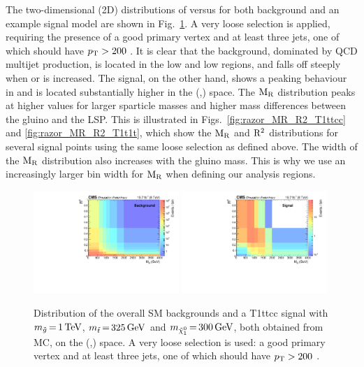 The two-dimensional (2D) distributions of \rsq versus \mr for both background and an example signal
model are shown in Fig.~\ref{fig:razor_MR_Rsq_bg_signal}. A very loose selection is applied,
requiring the presence of a good primary vertex and at least three jets, one of which should have
$p_{\mathrm{T}} > 200$ \GeV. It is clear that the background, dominated by QCD multijet production, is located
in the low \mr and low \rsq regions, and falls off steeply when \mr or \rsq is increased. The
signal, on the other hand, shows a peaking behaviour in \mr and is located substantially higher in
the (\mr,\rsq) space. 
The $\mathrm{M_R}$ distribution peaks at higher values for larger sparticle masses and higher mass
differences between the gluino and the LSP. This is illustrated
in Figs.~\ref{fig:razor_MR_R2_T1ttcc} and \ref{fig:razor_MR_R2_T1t1t}, which show the $\mathrm{M_R}$ and
$\mathrm{R^2}$ distributions for several signal points using the same loose selection as defined above.
The width of the $\mathrm{M_R}$ distribution also increases with the gluino mass. This is why we use an
increasingly larger bin width for $\mathrm{M_R}$ when defining our analysis regions. 


\begin{figure}[htpb]
\centering
\includegraphics[width=0.49\textwidth]{figures/razor_variables/MR_R2_jet1ptg200_bg} 
\includegraphics[width=0.49\textwidth]{figures/razor_variables/MR_R2_jet1ptg200_sig}
\caption{Distribution of the overall SM backgrounds and a T1ttcc signal with $m_{\tilde{g}} \,{=}\,
1\,\text{Te\hspace{-.08em}V}$, $m_{\tilde{t}} \,{=}\, 325\,\text{Ge\hspace{-.08em}V}$ and $m_{\tilde{\chi}_1^0} \,{=}\, 300\,\text{Ge\hspace{-.08em}V}$, both obtained
from MC, on the (\mr,\rsq) space. A very loose selection is used:  a good primary vertex and at
least three jets, one of which should have $p_{\mathrm{T}} > 200$ \GeV. 
\label{fig:razor_MR_Rsq_bg_signal}}
\end{figure}

